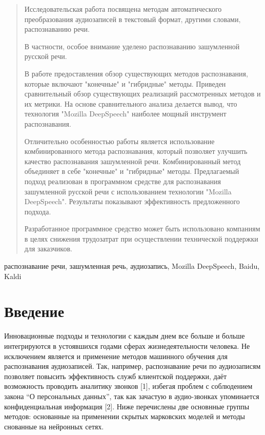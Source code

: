 \documentclass[conference]{IEEEtran}
\begin{document}
    \begin{abstract}
        Исследовательская работа посвящена методам автоматического преобразования аудиозаписей в текстовый формат, другими словами, распознаванию речи.

        В частности, особое внимание уделено распознаванию зашумленной русской речи.

        В работе предоставления обзор существующих методов распознавания, которые включают "конечные" и "гибридные" методы. Приведен сравнительный обзор существующих реализаций рассмотренных методов и их метрики. На основе сравнительного анализа делается вывод, что технология "Mozilla DeepSpeech" наиболее мощный инструмент распознавания.

        Отличительно особенностью работы является использование комбинированного метода распознавания, который позволяет улучшить качество распознавания зашумленной речи. Комбинированный метод объединяет в себе "конечные" и "гибридные" методы. Предлагаемый подход реализован в программном средстве для распознавания зашумленной русской речи с использованием технологии "Mozilla DeepSpeech". Результаты показывают эффективность предложенного подхода.

        Разработанное программное средство может быть использовано компаниям в целях снижения трудозатрат при осуществлении технической поддержки для заказчиков.
    \end{abstract}

    \begin{IEEEkeywords}
        распознавание речи, зашумленная речь, аудиозапись, Mozilla DeepSpeech, Baidu, Kaldi
    \end{IEEEkeywords}

    \section{Введение}

    Инновационные подходы и технологии с каждым днем все больше и больше интегрируются в устоявшихся годами сферах жизнедеятельности человека.
    Не исключением является и применение методов машинного обучения для распознавания аудиозаписей.
    Так, например, распознавание речи по аудиозаписям позволяет повысить эффективность служб клиентской поддержки, даёт возможность проводить аналитику звонков [1], избегая проблем с соблюдением закона “О персональных данных”, так как зачастую в аудио-звонках упоминается конфиденциальная информация [2].
    Ниже перечислены две основнные группы методов: основанные на применении скрытых марковских моделей и методы снованные на нейронных сетях.
\end{document}
